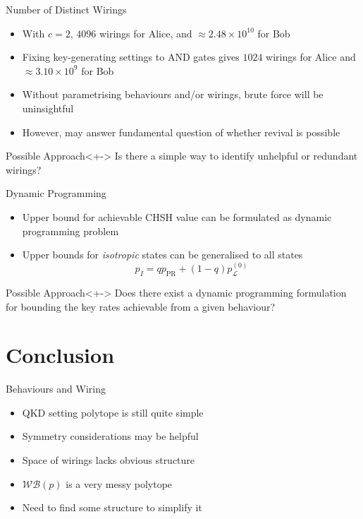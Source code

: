 \documentclass[xcolor=dvipsnames]{beamer}
\newcommand{\?}{\mathrel{?}} %
\newcommand{\Ls}{\mathcal{L}}
\newcommand{\PR}{\mathrm{PR}}
\newcommand{\sWB}{\mathcal{WB}}
\begin{document}
\begin{frame}{Number of Distinct Wirings}
  \begin{itemize}[<+->]
    \item With \(c=2\), \(4096\) wirings for Alice, and \(\approx 2.48 \times 10^{10}\) for Bob
    \item Fixing key-generating settings to AND gates gives \(1024\) wirings for Alice and \(\approx 3.10 \times 10^{9}\) for Bob
    \item Without parametrising behaviours and/or wirings, brute force will be uninsightful
    \item However, may answer fundamental question of whether revival is possible
  \end{itemize}
  \begin{block}{Possible Approach}<+->
    Is there a simple way to identify unhelpful or redundant wirings?
  \end{block}
\end{frame}

\begin{frame}{Dynamic Programming}
  \begin{itemize}[<+->]
    \item Upper bound for achievable CHSH value can be formulated as dynamic programming problem
    \item Upper bounds for \emph{isotropic} states can be generalised to all states
      \[ p_I = qp_{\PR} + (1-q)p_{\Ls}^{(0)} \]
  \end{itemize}
  \begin{block}{Possible Approach}<+->
    Does there exist a dynamic programming formulation for bounding the key rates achievable from a given behaviour?
  \end{block}
\end{frame}

\section*{Conclusion}

\begin{frame}{Behaviours and Wiring}
  \begin{itemize}[<+->]
    \item QKD setting polytope is still quite simple
    \item Symmetry considerations may be helpful
    \item Space of wirings lacks obvious structure
    \item \(\sWB(p)\) is a very messy polytope
    \item Need to find some structure to simplify it
  \end{itemize}
\end{frame}
\end{document}
